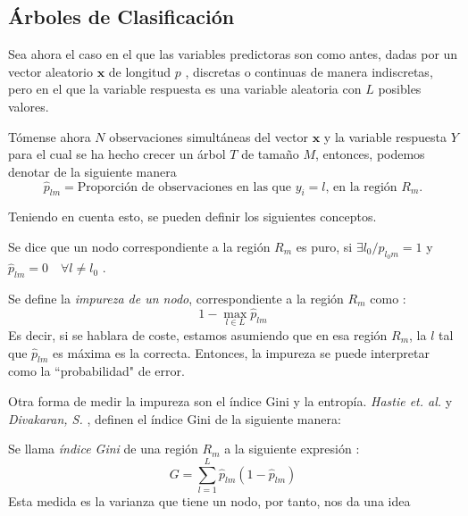 \subsection{Árboles de Clasificación}

\noindent Sea ahora el caso en el que las variables predictoras son como antes, dadas por un vector aleatorio $\mathbf{x}$ de longitud $p$ , discretas o continuas de manera indiscretas, pero en el que la variable respuesta es una variable aleatoria con $L$ posibles valores.

\noindent Tómense ahora $N$ observaciones simultáneas del vector $\mathbf{x}$ y la variable respuesta $Y$ para el cual se ha hecho crecer un árbol $T$ de tamaño $M$, entonces, podemos denotar de la siguiente manera \cite{Divakaran 2022, Brown 2004}
\begin{equation}
\hat{p}_{lm}=\text{Proporción de observaciones en las que $y_i=l$, en la región $R_m$.}
\end{equation}

\noindent Teniendo en cuenta esto, se pueden definir los siguientes conceptos.
\begin{defi}
Se dice que un nodo correspondiente a la región $R_m$ es puro, si $\exists l_0/ p_{l_0 m}=1$ y $\hat{p}_{lm}=0 \quad \forall l\neq l_0$ \cite{Divakaran 2022, Hastie 2001, James 2013, Brown 2004}. 
\end{defi}

\begin{defi}
Se define la \emph{impureza de un nodo}, correspondiente a la región $R_m$ como \cite{Brown 2004}:
\begin{equation}
1-\max_{l\in L} \hat{p}_{lm}
\end{equation}
\noindent Es decir, si se hablara de coste, estamos asumiendo que en esa región $R_m$, la $l$ tal que $\hat{p}_{lm}$ es máxima es la correcta. Entonces, la impureza se puede interpretar como la ``probabilidad" de error. 
\end{defi}
\noindent Otra forma de medir la impureza son el índice Gini y la entropía. \emph{Hastie et. al.} y \emph{Divakaran, S.} \cite{Hastie 2001, Divakaran 2022}, definen el índice Gini de la siguiente manera:
\begin{defi}
Se llama \emph{índice Gini} de una región $R_m$ a la siguiente expresión \cite{Hastie 2001, James 2013}:
\begin{equation}
G=\sum_{l=1}^L\hat{p}_{lm}(1-\hat{p}_{lm})
\end{equation}
Esta medida es la varianza que tiene un nodo, por tanto, nos da una idea
\end{defi}

